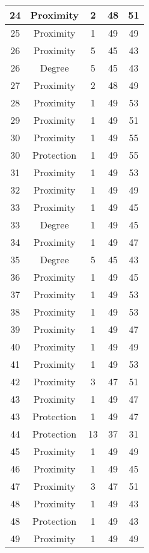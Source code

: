 \documentclass[results.tex]{subfiles}
\begin{document}
\begin{center}
\begin{tabular}{| c || c | c | c | c |}
    \hline
    24 & Proximity & 2 & 48 & 51 \\ 
    \hline
    25 & Proximity & 1 & 49 & 49 \\ 
    \hline
    26 & Proximity & 5 & 45 & 43 \\ 
    \hline
    26 & Degree & 5 & 45 & 43 \\ 
    \hline
    27 & Proximity & 2 & 48 & 49 \\ 
    \hline
    28 & Proximity & 1 & 49 & 53 \\ 
    \hline
    29 & Proximity & 1 & 49 & 51 \\ 
    \hline
    30 & Proximity & 1 & 49 & 55 \\ 
    \hline
    30 & Protection & 1 & 49 & 55 \\ 
    \hline
    31 & Proximity & 1 & 49 & 53 \\ 
    \hline
    32 & Proximity & 1 & 49 & 49 \\ 
    \hline
    33 & Proximity & 1 & 49 & 45 \\ 
    \hline
    33 & Degree & 1 & 49 & 45 \\ 
    \hline
    34 & Proximity & 1 & 49 & 47 \\ 
    \hline
    35 & Degree & 5 & 45 & 43 \\ 
    \hline
    36 & Proximity & 1 & 49 & 45 \\ 
    \hline
    37 & Proximity & 1 & 49 & 53 \\ 
    \hline
    38 & Proximity & 1 & 49 & 53 \\ 
    \hline
    39 & Proximity & 1 & 49 & 47 \\ 
    \hline
    40 & Proximity & 1 & 49 & 49 \\ 
    \hline
    41 & Proximity & 1 & 49 & 53 \\ 
    \hline
    42 & Proximity & 3 & 47 & 51 \\ 
    \hline
    43 & Proximity & 1 & 49 & 47 \\ 
    \hline
    43 & Protection & 1 & 49 & 47 \\ 
    \hline
    44 & Protection & 13 & 37 & 31 \\ 
    \hline
    45 & Proximity & 1 & 49 & 49 \\ 
    \hline
    46 & Proximity & 1 & 49 & 45 \\ 
    \hline
    47 & Proximity & 3 & 47 & 51 \\ 
    \hline
    48 & Proximity & 1 & 49 & 43 \\ 
    \hline
    48 & Protection & 1 & 49 & 43 \\ 
    \hline
    49 & Proximity & 1 & 49 & 49 \\ 
    \hline   \end{tabular}
\end{center}
\end{document}
